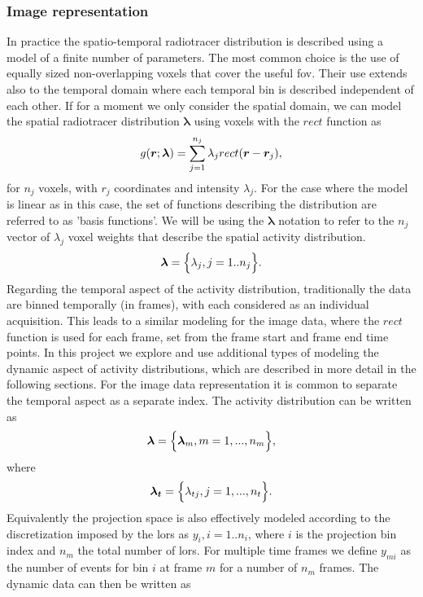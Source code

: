 \subsubsection{Image representation}
In practice the spatio-temporal radiotracer distribution is described using a model of a finite number of parameters. The most common choice is the use of equally sized non-overlapping voxels that cover the useful \gls{fov}. Their use extends also to the temporal domain where each temporal bin is described independent of each other. 
If for a moment we only consider the spatial domain, we can model the spatial radiotracer distribution $\bm{\lambda}$ using voxels with the  $rect$ function as
\begin{equation}
   g(\bm{r};\bm\lambda) = \sum_{j=1}^{n_{j}} \lambda_j {rect}(\bm{r}-\bm{r}_j)  \\, 
\end{equation}
for ${n_{j}}$ voxels, with $r_j$ coordinates and intensity $\lambda_j$.
For the case where the model is linear as in this case, the set of functions describing the distribution are referred to as 'basis functions'. We will be using the $\bm\lambda$ notation to refer to the ${n_{j}}$ vector of  $\lambda_j$ voxel weights that describe the spatial activity distribution. 
\begin{equation}
   \bm\lambda = \Big\{ \lambda_j,j=1..n_j \Big\} \\.
\end{equation}
Regarding the temporal aspect of the activity distribution, traditionally the data are binned temporally (in frames), with each considered as an individual acquisition. This leads to a similar modeling for the image data, where the $rect$ function is used for each frame, set from the frame start and frame end time points. In this project we explore and use additional types of modeling the dynamic aspect of activity distributions, which are described in more detail in the following sections. For the image data representation it is common to separate the temporal aspect as a separate index. The activity distribution can be written as
\begin{equation}
   \bm{\lambda} = \Big\{ {\bm{\lambda}_m,m=1,...,n_m} \Big\} \\,
\end{equation}
where
\begin{equation}
   \bm{\lambda_t} = \Big\{ {\lambda_{tj},j=1,...,n_t} \Big\} \\.
\end{equation}
Equivalently the projection space is also effectively modeled according to the discretization imposed by the \glspl{lor} as $y_i,i=1..n_i$, where $i$ is the projection bin index and $n_m$ the total number of \glspl{lor}. For multiple time frames we define $y_{mi}$ as the number of events for bin $i$ at frame $m$ for a number of $n_m$ frames. The dynamic data can then be written as

